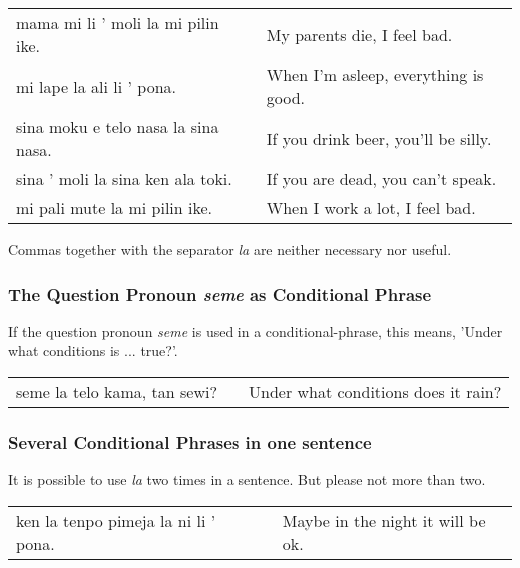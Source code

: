 \begin{supertabular}{p{5,5cm}|ll}
mama mi li ' moli la mi pilin ike. && My parents die, I feel bad. \\
mi lape la ali li ' pona. && When I'm asleep, everything is good. \\
sina moku e telo nasa la sina nasa. && If you drink beer, you'll be silly. \\
sina ' moli la sina ken ala toki. && If you are dead, you can't speak. \\
mi pali mute la mi pilin ike. && When I work a lot, I feel bad. \\
\end{supertabular} 

Commas together with the separator \textit{la} are neither necessary nor useful. 

%
%
\subsubsection*{The Question Pronoun \textit{seme} as Conditional Phrase}
%
%

If the question pronoun \textit{seme} is used in a conditional-phrase, this means, 'Under what conditions is ... true?'.

\begin{supertabular}{p{5,5cm}|ll}
seme la telo kama, tan sewi? && Under what conditions does it rain? \\  
\end{supertabular} 

%
%
\subsubsection*{Several Conditional Phrases in one sentence}
%
%
It is possible to use \textit{la} two times in a sentence. 
But please not more than two. 

\begin{supertabular}{p{5,5cm}|ll}
ken la tenpo pimeja la ni li ' pona. && Maybe in the night it will be ok. \\  
\end{supertabular} 

